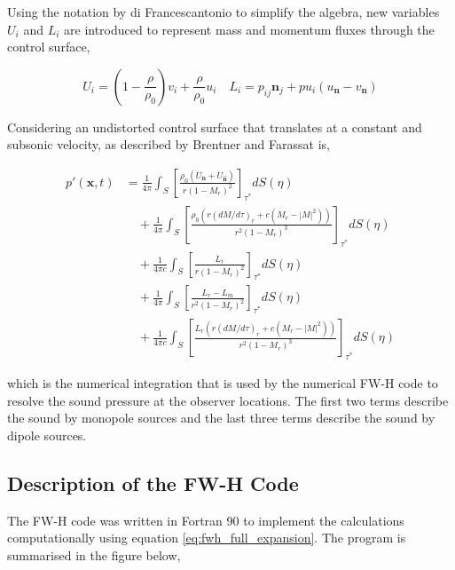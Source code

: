  Using the notation by di Francescantonio \cite{Francescantonio1997} to simplify the algebra, new variables $U_i$ and $L_i$ are introduced to represent mass and momentum fluxes through the control surface,

\begin{equation*}
    U_i=(1-\frac{\rho}{\rho_0})v_i  + \frac{\rho}{\rho_0}u_i \quad     
    L_i=p_{ij}\textbf{n}_j+pu_i(u_{\textbf{n}}-v_{\textbf{n}})
\end{equation*}

Considering an undistorted control surface that translates at a constant and subsonic velocity, as described by Brentner and Farassat \cite{Brentner1998} is,

\begin{equation}
\begin{split}
    p'(\bm{x}, t) 
    &= \frac{1}{4\pi} \int_{S} \left[ \frac{\rho_0 (\dot{U}_{\textbf{n}} + U_{\hat{\textbf{n}}})}{r(1-M_r)^2} \right]_{\tau^*} dS(\eta) \\
    &\quad + \frac{1}{4\pi} \int_{S} \left[ \frac{\rho_0 (r(dM/d\tau)_r + c(M_r - |M|^2))}{r^2(1-M_r)^3} \right]_{\tau^*} dS(\eta) \\
    &\quad + \frac{1}{4\pi c} \int_{S} \left[ \frac{\dot{L}_r}{r(1-M_r)^2} \right]_{\tau^*} dS(\eta) \\
    &\quad + \frac{1}{4\pi} \int_{S} \left[ \frac{L_r - L_m}{r^2(1-M_r)^2} \right]_{\tau^*} dS(\eta) \\
    &\quad + \frac{1}{4\pi c} \int_{S} \left[ \frac{L_r(r(dM/d\tau)_r + c(M_r - |M|^2))}{r^2(1-M_r)^3} \right]_{\tau^*} dS(\eta)
\end{split}
\label{eq:fwh_full_expansion}
\end{equation}

which is the numerical integration that is used by the numerical FW-H code to resolve the sound pressure at the observer locations. The first two terms describe the sound by monopole sources and the last three terms describe the sound by dipole sources.

\subsection{Description of the FW-H Code} \label{subsec:FWH_description}
The FW-H code was written in Fortran 90 to implement the calculations computationally using equation \ref{eq:fwh_full_expansion}. The program is summarised in the figure below,

